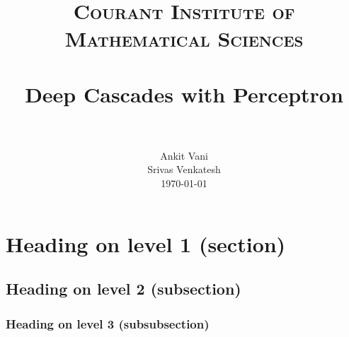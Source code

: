 \documentclass[paper=a4, fontsize=11pt]{scrartcl}
\title{
		\usefont{OT1}{bch}{b}{n}
		\normalfont \normalsize \textsc{Courant Institute of Mathematical Sciences} \\ [25pt]
		\horrule{0.5pt} \\[0.4cm]
		\huge Deep Cascades with Perceptron \\
		\horrule{2pt} \\[0.5cm]
}
\author{
		\normalfont 								\normalsize
        Ankit Vani\\ \normalsize Srivas Venkatesh\\[-3pt]		\normalsize
        \today
}
\date{}
\numberwithin{equation}{section}		%
\numberwithin{figure}{section}			%
\numberwithin{table}{section}				%
\begin{document}
\maketitle
\section{Heading on level 1 (section)}

\subsection{Heading on level 2 (subsection)}


\subsubsection{Heading on level 3 (subsubsection)}

\printbibliography
\end{document}
